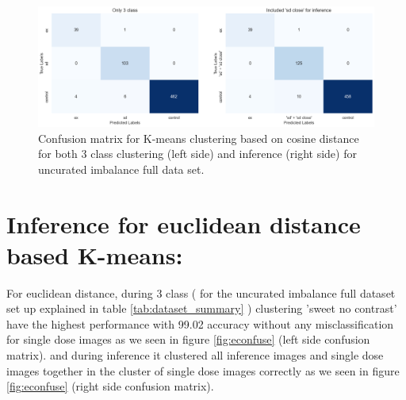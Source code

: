 \begin{table}[H]
    \centering
    \caption{Inference evaluation results on cosine distance based K-means}
    \label{tab:professional_table}
\end{table}

\begin{figure}[H]
    \centering
    \includegraphics[scale=0.37]{figures/cconfusion.png} 
    \caption{Confusion matrix for K-means clustering based on cosine distance for both 3 class clustering (left side) and inference (right side) for uncurated imbalance full data set. }
    \label{fig:cconfusion}
\end{figure}



\section{Inference for euclidean distance based K-means:}
For euclidean distance, during 3 class ( for the uncurated imbalance full dataset set up explained in table \ref{tab:dataset_summary} ) clustering 'sweet no contrast' have the highest performance with 99.02 accuracy without any misclassification for single dose images as we seen 
in figure \ref{fig:econfuse} (left side confusion matrix). and during inference it clustered all inference images and single dose images together in the cluster of single dose images correctly as we seen in figure \ref{fig:econfuse} (right side confusion matrix).



